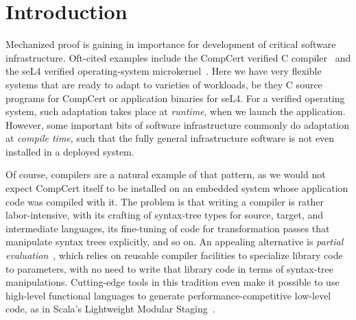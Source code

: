 \documentclass[sigplan,10pt,review,anonymous]{acmart}\settopmatter{printfolios=true,printccs=false,printacmref=false}
\begin{document}
\maketitle

\section{Introduction} \label{sec:intro}

Mechanized proof is gaining in importance for development of critical software infrastructure.
Oft-cited examples include the CompCert verified C compiler~\cite{Compcert} and the seL4 verified operating-system microkernel~\cite{sel4SOSP09}.
Here we have very flexible systems that are ready to adapt to varieties of workloads, be they C source programs for CompCert or application binaries for seL4.
For a verified operating system, such adaptation takes place at \emph{runtime}, when we launch the application.
However, some important bits of software infrastructure commonly do adaptation at \emph{compile time}, such that the fully general infrastructure software is not even installed in a deployed system.

Of course, compilers are a natural example of that pattern, as we would not expect CompCert itself to be installed on an embedded system whose application code was compiled with it.
The problem is that writing a compiler is rather labor-intensive, with its crafting of syntax-tree types for source, target, and intermediate languages, its fine-tuning of code for transformation passes that manipulate syntax trees explicitly, and so on.
An appealing alternative is \emph{partial evaluation}~\cite{PartialEvaluation}, which relies on reusable compiler facilities to specialize library code to parameters, with no need to write that library code in terms of syntax-tree manipulations.
Cutting-edge tools in this tradition even make it possible to use high-level functional languages to generate performance-competitive low-level code, as in Scala's Lightweight Modular Staging~\cite{LMS}.
\end{document}
